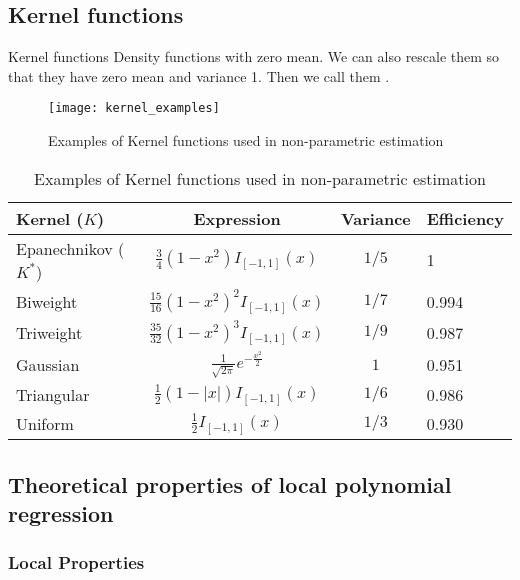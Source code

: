 \subsection{Kernel functions}

\begin{definition}{Kernel functions}{}
    Density functions with zero mean.
    \tcblower
    We can also rescale them so that they have zero mean and
    variance 1. Then we call them .
\end{definition}

\begin{figure}[H]
	\texttt{[image: kernel\_examples]}
	\caption{Examples of Kernel functions used in non-parametric estimation}
\end{figure}

\begin{table}[H]
    \caption{Examples of Kernel functions used in non-parametric estimation}
	\begin{tabular}{lccl}
		\toprule
		Kernel ($K$)         & Expression                                & Variance & Efficiency \\
		\midrule
		Epanechnikov ($K^*$) & $\frac{3}{4}(1-x^2)I_{[-1,1]}(x)$         & $1/5$    & 1          \\
		Biweight             & $\frac{15}{16}(1-x^2)^2I_{[-1,1]}(x)$     & $1/7$    & 0.994      \\
		Triweight            & $\frac{35}{32}(1-x^2)^3I_{[-1,1]}(x)$     & $1/9$    & 0.987      \\
		Gaussian             & $\frac{1}{\sqrt{2\pi}}e^{-\frac{x^2}{2}}$ & $1$      & 0.951      \\
		Triangular           & $\frac{1}{2}(1-|x|)I_{[-1,1]}(x)$         & $1/6$    & 0.986      \\
		Uniform              & $\frac{1}{2}I_{[-1,1]}(x)$                & $1/3$    & 0.930      \\
		\bottomrule
	\end{tabular}
\end{table}

\subsection{Theoretical properties of local polynomial regression}

\subsubsection{Local Properties}

